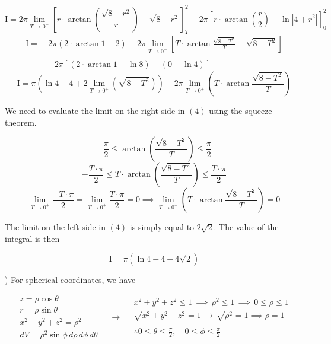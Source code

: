 \documentclass{article}
\begin{document}
\begin{equation*}
\mathrm{I}=2\pi\lim_{T\to0^+}\left[r\cdot\arctan\left(\frac{\sqrt{8-r^2}}r\right)-\sqrt{8-r^2}\right]_T^2-2\pi\left[r\cdot\arctan\left(\frac r2\right)-\ln\left|4+r^2\right|\right]_0^2
\end{equation*}
\begin{align*}
\mathrm{I}=\:&2\pi\left(2\cdot\arctan1-2\right)-2\pi\lim_{T\to0^+}\left[T\cdot\arctan\frac{\sqrt{8-T^2}}T-\sqrt{8-T^2}\right]\\\\&-2\pi\left[\left(2\cdot\arctan1-\ln8\right)-(0-\ln4)\right]
\end{align*}
\begin{equation}
\mathrm{I}=\pi\left(\ln4-4+2\lim_{T\to0^+}\left(\sqrt{8-T^2}\right)\right)-2\pi\lim_{T\to0^+}\left(T\cdot\arctan\frac{\sqrt{8-T^2}}T\right)
\end{equation}

\hfill

\noindent We need to evaluate the limit on the right side in $(4)$ using the squeeze theorem.

\[-\frac\pi2\leq\arctan\left(\frac{\sqrt{8-T^2}}T\right)\leq\frac\pi2\]
\[-\frac{T\cdot\pi}2\leq T\cdot\arctan\left(\frac{\sqrt{8-T^2}}T\right)\leq\frac{T\cdot\pi}2\]
\[\lim_{T\to0^+}\frac{-T\cdot\pi}2=\lim_{T\to0^+}\frac{T\cdot\pi}2=0\implies\lim_{T\to0^+}\left(T\cdot\arctan\frac{\sqrt{8-T^2}}T\right)=0\]

\hfill

\noindent The limit on the left side in $(4)$ is simply equal to $2\sqrt2$. The value of the integral is then

\[\boxed{\mathrm{I}=\pi\left(\ln4-4+4\sqrt2\right)}\]

\hfill

) For spherical coordinates, we have

\[
\begin{array}{c}
z=\rho\cos\theta\\
r=\rho\sin\theta\\
x^2+y^2+z^2=\rho^2\\
dV=\rho^2\sin\phi\,d\rho\,d\phi\,d\theta
\end{array}\quad\rightarrow\quad
\begin{array}{c}
x^2+y^2+z^2\leq1\,\implies\,\rho^2\leq1\,\implies\,0\leq\rho\leq1\\
\sqrt{x^2+y^2+z^2}=1\,\rightarrow\,\sqrt{\rho^2}=1\implies\rho=1\\\\
\displaystyle\therefore0\leq\theta\leq\frac\pi2,\quad0\leq\phi\leq\frac\pi2
\end{array}
\]
\end{document}
